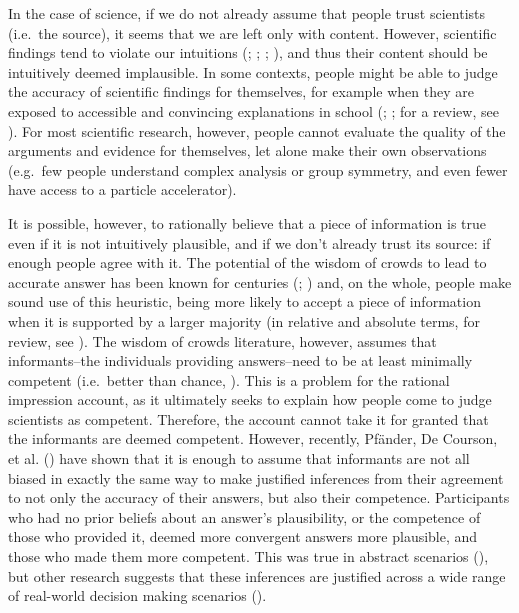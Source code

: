 \documentclass[
  jou,
  floatsintext,
  longtable,
  nolmodern,
  notxfonts,
  notimes,
  colorlinks=true,linkcolor=blue,citecolor=blue,urlcolor=blue]{apa7}
\begin{document}
In the case of science, if we do not already assume that people trust
scientists (i.e.~the source), it seems that we are left only with
content. However, scientific findings tend to violate our intuitions
(;
;
;
), and
thus their content should be intuitively deemed implausible. In some
contexts, people might be able to judge the accuracy of scientific
findings for themselves, for example when they are exposed to accessible
and convincing explanations in school
(;
; for a review, see
). For most scientific research, however, people cannot evaluate
the quality of the arguments and evidence for themselves, let alone make
their own observations (e.g.~few people understand complex analysis or
group symmetry, and even fewer have access to a particle accelerator).

It is possible, however, to rationally believe that a piece of
information is true even if it is not intuitively plausible, and if we
don't already trust its source: if enough people agree with it. The
potential of the wisdom of crowds to lead to accurate answer has been
known for centuries
(;
)
and, on the whole, people make sound use of this heuristic, being more
likely to accept a piece of information when it is supported by a larger
majority (in relative and absolute terms, for review, see
). The
wisdom of crowds literature, however, assumes that informants--the
individuals providing answers--need to be at least minimally competent
(i.e.~better than chance,
).
This is a problem for the rational impression account, as it ultimately
seeks to explain how people come to judge scientists as competent.
Therefore, the account cannot take it for granted that the informants
are deemed competent. However, recently, Pfänder, De Courson, et al.
() have shown that it is
enough to assume that informants are not all biased in exactly the same
way to make justified inferences from their agreement to not only the
accuracy of their answers, but also their competence. Participants who
had no prior beliefs about an answer's plausibility, or the competence
of those who provided it, deemed more convergent answers more plausible,
and those who made them more competent. This was true in abstract
scenarios (), but other research suggests that these inferences are
justified across a wide range of real-world decision making scenarios
().
\end{document}
